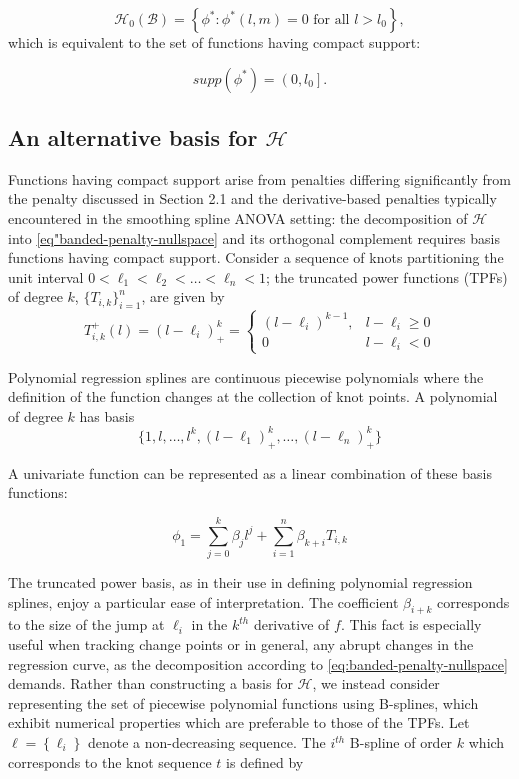 \documentclass[12pt]{article}
\theoremstyle{definition}
\begin{document}
\begin{equation} \label{eq:banded-penalty-nullspace}
\mathcal{H}_0\left(\mathcal{B}\right) = \left\{ \phi^*: \phi^*\left(l,m\right) = 0 \mbox{ for all } l > l_0 \right\},
\end{equation}
\noindent
which is equivalent to the set of functions having compact support:

\[
supp\left( \phi^* \right) = \left(0,l_0\right].
\]

\subsection{An alternative basis for $\mathcal{H}$}

Functions having compact support arise from penalties differing significantly from the penalty discussed in Section 2.1 and the derivative-based penalties typically encountered in the smoothing spline ANOVA setting: the decomposition of $\mathcal{H}$ into \ref{eq"banded-penalty-nullspace} and its orthogonal complement requires basis functions having compact support. Consider a sequence of knots partitioning the unit interval $0 < \ell_1 < \ell_2 < \dots < \ell_n < 1$; the truncated power functions (TPFs) of degree $k$, $\lbrace T_{i,k} \rbrace_{i=1}^n$, are given by
\begin{equation*}
T^+_{i,k}\left(l\right) = \left(l - \ell_i\right)^{k}_+ = \left\{\begin{array}{lr} \left(l-\ell_i\right)^{k-1}, & l-\ell_i \ge0\\ 0 & l-\ell_i < 0\end{array}\right.
\end{equation*}

Polynomial regression splines are continuous piecewise polynomials where the definition of the function changes at the collection of knot points. A polynomial of degree $k$ has basis
\[
\lbrace 1,l,\dots,l^k, \left(l - \ell_1\right)^{k}_+,\dots, \left(l - \ell_n\right)^{k}_+ \rbrace
\]

A univariate function can be represented as a linear combination of these basis functions: 

\[
\phi_1 = \sum_{j=0}^k \beta_j l^j + \sum_{i=1}^n \beta_{k+i} T_{i,k}
\]
\noindent

The truncated power basis, as in their use in defining polynomial regression splines, enjoy a particular ease of interpretation. The coefficient $\beta_{i+k}$ corresponds to the size of the jump at $\ell_i$ in the $k^{th}$ derivative of $f$. This fact is especially useful when tracking change points or in general, any abrupt changes in the regression curve, as the decomposition according to \ref{eq:banded-penalty-nullspace} demands. Rather than constructing a basis for $\mathcal{H}$, we instead consider representing the set of piecewise polynomial functions using B-splines, which exhibit numerical properties which are preferable to those of the TPFs. Let $\ell= \left\{ \ell_i \right\}$ denote a non-decreasing sequence. The $i^{th}$ B-spline of order $k$ which corresponds to the knot sequence $t$ is defined by 
\end{document}
